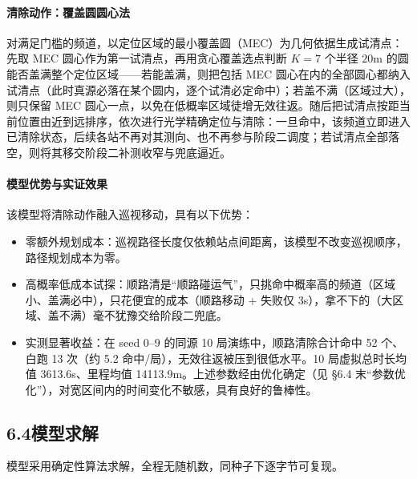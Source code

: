 \documentclass[UTF8, zihao=5,AutoFakeBold=2]{ctexart}
\begin{document}
\paragraph{清除动作：覆盖圆圆心法}
对满足门槛的频道，以定位区域的最小覆盖圆（MEC）为几何依据生成试清点：先取 MEC 圆心作为第一试清点，再用贪心覆盖选点判断 \(K=7\) 个半径 \(20\text{m}\) 的圆能否盖满整个定位区域——若能盖满，则把包括 MEC 圆心在内的全部圆心都纳入试清点（此时真源必落在某个圆内，逐个试清必定命中）；若盖不满（区域过大），则只保留 MEC 圆心一点，以免在低概率区域徒增无效往返。随后把试清点按距当前位置由近到远排序，依次进行光学精确定位与清除：一旦命中，该频道立即进入已清除状态，后续各站不再对其测向、也不再参与阶段二调度；若试清点全部落空，则将其移交阶段二补测收窄与兜底逼近。

\paragraph{模型优势与实证效果}
该模型将清除动作融入巡视移动，具有以下优势：
\begin{itemize}
    \item 零额外规划成本：巡视路径长度仅依赖站点间距离，该模型不改变巡视顺序，路径规划成本为零。
    \item 高概率低成本试探：顺路清是“顺路碰运气”，只挑命中概率高的频道（区域小、盖满必中），只花便宜的成本（顺路移动 + 失败仅 3s），拿不下的（大区域、盖不满）毫不犹豫交给阶段二兜底。
    \item 实测显著收益：在 seed 0--9 的同源 10 局演练中，顺路清除合计命中 52 个、白跑 13 次（约 5.2 命中/局），无效往返被压到很低水平。10 局虚拟总时长均值 3613.6s、里程均值 14113.9m。上述参数经由优化确定（见 \S6.4 末“参数优化”），对宽区间内的时间变化不敏感，具有良好的鲁棒性。
\end{itemize}

\subsection*{6.4模型求解}

模型采用确定性算法求解，全程无随机数，同种子下逐字节可复现。
\end{document}

